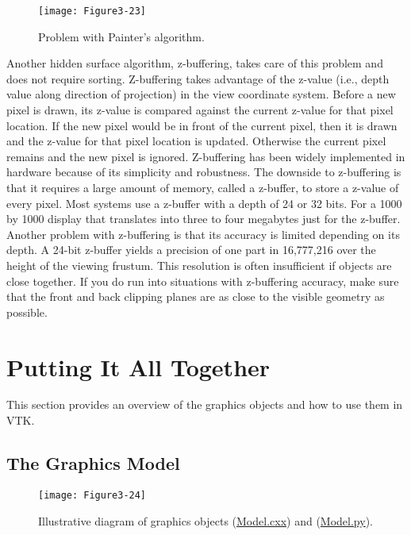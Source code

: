 \begin{figure}[!htb]
  \centering
  \texttt{[image: Figure3-23]}\\
  \caption{Problem with Painter's algorithm.}\label{fig:Figure3-23}
\end{figure}

Another hidden surface algorithm, z-buffering, takes care of this problem and does not require sorting. Z-buffering takes advantage of the z-value (i.e., depth value along direction of projection) in the view coordinate system. Before a new pixel is drawn, its z-value is compared against the current z-value for that pixel location. If the new pixel would be in front of the current pixel, then it is drawn and the z-value for that pixel location is updated. Otherwise the current pixel remains and the new pixel is ignored. Z-buffering has been widely implemented in hardware because of its simplicity and robustness. The downside to z-buffering is that it requires a large amount of memory, called a z-buffer, to store a z-value of every pixel. Most systems use a z-buffer with a depth of 24 or 32 bits. For a 1000 by 1000 display that translates into three to four megabytes just for the z-buffer. Another problem with z-buffering is that its accuracy is limited depending on its depth. A 24-bit z-buffer yields a precision of one part in 16,777,216 over the height of the viewing frustum. This resolution is often insufficient if objects are close together. If you do run into situations with z-buffering accuracy, make sure that the front and back clipping planes are as close to the visible geometry as possible.

\section{Putting It All Together}
This section provides an overview of the graphics objects and how to
use them in VTK.

\subsection{The Graphics Model}

\begin{figure}[!htb]
  \centering
  \texttt{[image: Figure3-24]}\\
  \caption{Illustrative diagram of graphics objects (\href{https://lorensen.github.io/VTKExamples/site/Cxx/Rendering/Model/}{Model.cxx}) and (\href{https://lorensen.github.io/VTKExamples/site/Python/Rendering/Model/}{Model.py}).}\label{fig:Figure3-24}
\end{figure}


